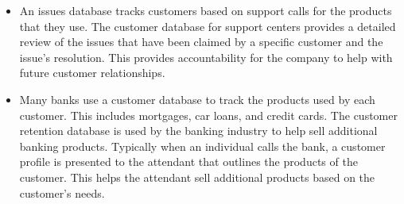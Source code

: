 \documentclass[12pt]{article}
\begin{document}
\begin{itemize}
 
\item 
An issues database tracks customers based on support calls for the products that they use. The customer database for support centers provides a detailed review of the issues that have been claimed by a specific customer and the issue’s resolution. This provides accountability for the company to help with future customer relationships.

 

\item Many banks use a customer database to track the products used by each customer. This includes mortgages, car loans, and credit cards. The customer retention database is used by the banking industry to help sell additional banking products. Typically when an individual calls the bank, a customer profile is presented to the attendant that outlines the products of the customer. This helps the attendant sell additional products based on the customer’s needs.
\end{itemize}
\end{document}
